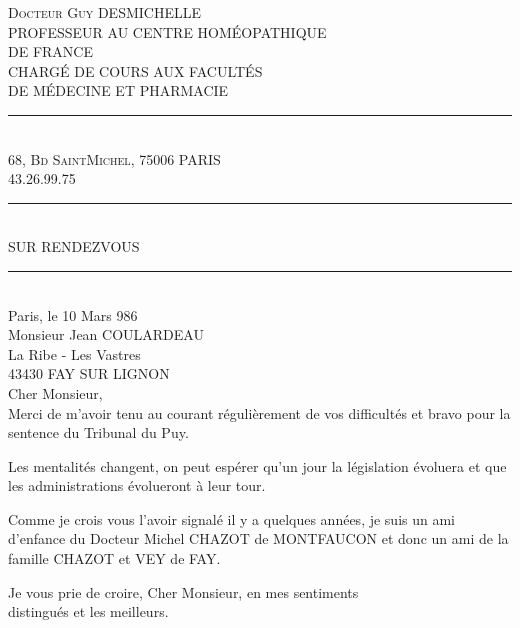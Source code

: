 \textsc{Docteur Guy} DESMICHELLE\\
PROFESSEUR AU CENTRE HOMÉOPATHIQUE\\
DE FRANCE\\
CHARGÉ DE COURS AUX FACULTÉS\\
DE MÉDECINE ET PHARMACIE\\
\rule{1cm}{.4pt}\\
68, \textsc{Bd SaintMichel}, 75006 PARIS\\
43.26.99.75\\
\rule{1cm}{.4pt}\\
SUR RENDEZVOUS\\
\rule{1cm}{.4pt}\\

Paris, le 10 Mars 986\\

Monsieur Jean COULARDEAU\\
La Ribe - Les Vastres\\
43430 FAY SUR LIGNON\\

Cher Monsieur,\\

Merci de m'avoir tenu au courant régulièrement de vos difficultés et bravo pour la sentence du Tribunal du Puy.

Les mentalités changent, on peut espérer qu'un jour la législation évoluera et que les administrations évolueront à leur tour.

Comme je crois vous l'avoir signalé il y a quelques années, je suis un ami d'enfance du Docteur Michel CHAZOT de MONTFAUCON et donc un ami de la famille CHAZOT et VEY de FAY.

Je vous prie de croire, Cher Monsieur, en mes sentiments\\
distingués et les meilleurs.\\

\\
